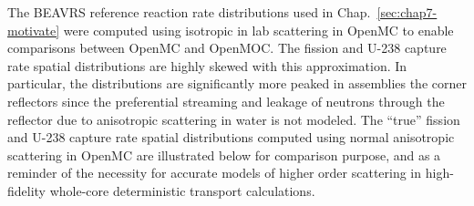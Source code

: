 \begin{appendices}
The \ac{BEAVRS} reference reaction rate distributions used in Chap.~\ref{sec:chap7-motivate} were computed using isotropic in lab scattering in OpenMC to enable comparisons between OpenMC and OpenMOC. The fission and U-238 capture rate spatial distributions are highly skewed with this approximation. In particular, the distributions are significantly more peaked in assemblies the corner reflectors since the preferential streaming and leakage of neutrons through the reflector due to anisotropic scattering in water is not modeled. The ``true'' fission and U-238 capture rate spatial distributions computed using normal anisotropic scattering in OpenMC are illustrated below for comparison purpose, and as a reminder of the necessity for accurate models of higher order scattering in high-fidelity whole-core deterministic transport calculations.


\end{appendices}
